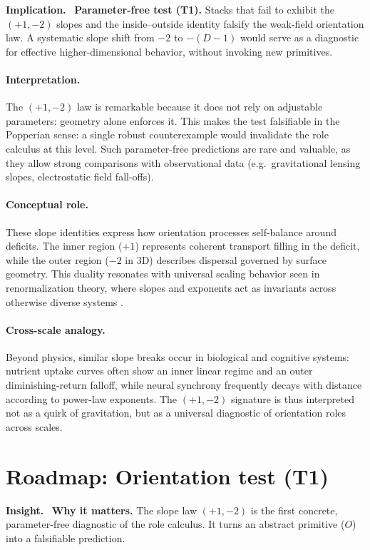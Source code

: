 \documentclass[12pt,a4paper,oneside]{scrreprt}
\newenvironment{insight}{\par\vspace{0.5em}\noindent\textbf{Insight.}\ }{\par\vspace{0.5em}}
\newenvironment{implication}{\par\vspace{0.5em}\noindent\textbf{Implication.}\ }{\par\vspace{0.5em}}
\begin{document}
\begin{implication}
\textbf{Parameter-free test (T1).} 
Stacks that fail to exhibit the $(+1,-2)$ slopes and the inside--outside identity falsify 
the weak-field orientation law. 
A systematic slope shift from $-2$ to $-(D-1)$ would serve as a diagnostic for effective 
higher-dimensional behavior, without invoking new primitives.
\end{implication}

\paragraph{Interpretation.} 
The $(+1,-2)$ law is remarkable because it does not rely on adjustable parameters: 
geometry alone enforces it. 
This makes the test falsifiable in the Popperian sense: a single robust counterexample 
would invalidate the role calculus at this level. 
Such parameter-free predictions are rare and valuable, as they allow strong comparisons 
with observational data (e.g.\ gravitational lensing slopes, electrostatic field fall-offs). 

\paragraph{Conceptual role.} 
These slope identities express how orientation processes self-balance around 
deficits. The inner region ($+1$) represents coherent transport filling in the deficit, 
while the outer region ($-2$ in 3D) describes dispersal governed by surface geometry. 
This duality resonates with universal scaling behavior seen in renormalization theory, 
where slopes and exponents act as invariants across otherwise diverse systems 
\citep{Wilson1971RG,Kadanoff1966}. 

\paragraph{Cross-scale analogy.} 
Beyond physics, similar slope breaks occur in biological and cognitive systems: 
nutrient uptake curves often show an inner linear regime and an outer diminishing-return falloff, 
while neural synchrony frequently decays with distance according to power-law exponents. 
The $(+1,-2)$ signature is thus interpreted not as a quirk of gravitation, 
but as a universal diagnostic of orientation roles across scales.

\section*{Roadmap: Orientation test (T1)}
\begin{insight}
\textbf{Why it matters.} 
The slope law $(+1,-2)$ is the first concrete, parameter-free diagnostic 
of the role calculus. 
It turns an abstract primitive ($O$) into a falsifiable prediction.
\end{insight}
\end{document}
